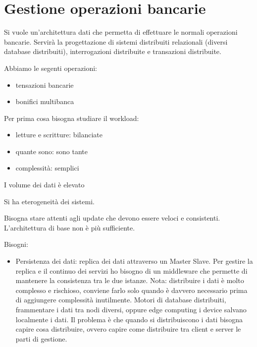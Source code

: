 \section{Gestione operazioni bancarie}
Si vuole un'architettura dati che permetta di effettuare le normali operazioni 
bancarie. Servirà la progettazione di sistemi distribuiti relazionali (diversi database distribuiti), 
interrogazioni distribuite e transazioni distribuite.

Abbiamo le segenti operazioni:
\begin{itemize}
    \item tensazioni bancarie
    \item bonifici multibanca
\end{itemize}

Per prima cosa bisogna studiare il workload:
\begin{itemize}
    \item letture e scritture: bilanciate
    \item quante sono: sono tante
    \item complessità: semplici
\end{itemize}

I volume dei dati è elevato

Si ha eterogeneità dei sistemi.

Bisogna stare attenti agli update che devono essere veloci e consistenti. L'architettura
di base non è più sufficiente.

Bisogni:
\begin{itemize}
    \item Persistenza dei dati: replica dei dati attraverso un Master Slave. Per 
    gestire la replica e il continuo dei servizi ho bisogno di un middleware che 
    permette di mantenere la consistenza tra le due istanze. Nota: distribuire 
    i dati è molto complesso e rischioso, conviene farlo solo quando è davvero 
    necessario prima di aggiungere complessità inutilmente. Motori di database 
    distribuiti, frammentare i dati tra nodi diversi, oppure edge computing i device
    salvano localmente i dati. Il problema è che quando si distribuiscono i dati 
    bisogna capire cosa distribuire, ovvero capire come distribuire tra client e 
    server le parti di gestione.
\end{itemize}

